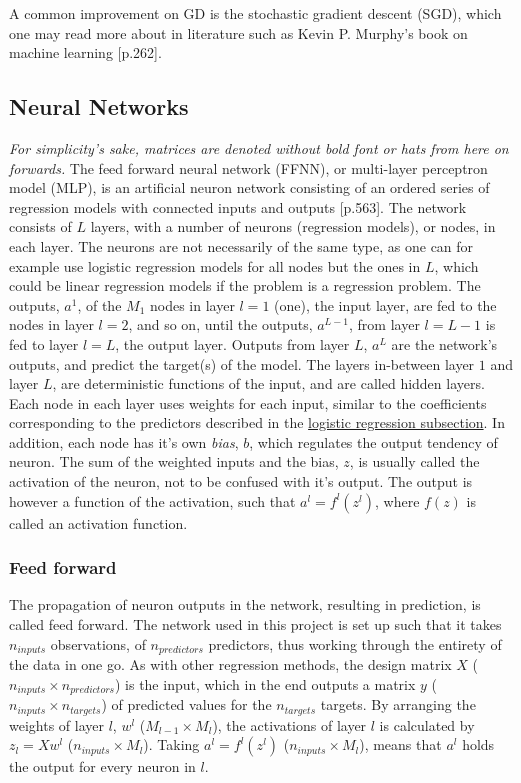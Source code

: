 \documentclass[%
oneside,                 %
final,                   %
10pt]{article}
\begin{document}
A common improvement on GD is the stochastic gradient descent (SGD), which one may read more about in literature such as Kevin P. Murphy's book on machine learning \citep{MLMurphy}[p.262].

\subsection{Neural Networks} \label{Section_M_NN}
\textit{For simplicity's sake, matrices are denoted without bold font or hats from here on forwards.} The feed forward neural network (FFNN), or multi-layer perceptron model (MLP), is an artificial neuron network consisting of an ordered series of regression models with connected inputs and outputs \citep{MLMurphy}[p.563]. The network consists of $L$ layers, with  a number of neurons (regression models), or nodes, in each layer. The neurons are not necessarily of the same type, as one can for example use logistic regression models for all nodes but the ones in $L$, which could be linear regression models if the problem is a regression problem. The outputs, $a^1$, of the $M_1$ nodes in layer $l=1$ (one), the input layer, are fed to the nodes in layer $l=2$, and so on, until the outputs, $a^{L-1}$, from layer $l=L-1$ is fed to layer $l=L$, the output layer. Outputs from layer $L$, $a^L$ are the network's outputs, and predict the target(s) of the model. The layers in-between layer $1$ and layer $L$, are deterministic functions of the input, and are called hidden layers.  Each node in each layer uses weights for each input, similar to the coefficients  corresponding to the predictors described in the \hyperref[Section_M_Logreg]{logistic regression subsection}. In addition, each node has it's own \textit{bias}, $b$, which regulates the output tendency of neuron. The sum of the weighted inputs and the bias, $z$, is usually called the activation of the neuron, not to be confused with it's output. The output is however a function of the activation, such that $a^l=f^l(z^l)$, where $f(z)$ is called an activation function. 


\subsubsection{Feed forward}
The propagation of neuron outputs in the network, resulting in prediction, is called feed forward. The network used in this project is set up such that it takes  $n_{inputs}$ observations, of $n_{predictors}$ predictors, thus working through the entirety of the data in one go. As with other regression methods, the design matrix $X$ ($n_{inputs} \times n_{predictors}$) is the input, which in the end outputs a matrix $ y$ ($n_{inputs} \times n_{targets}$) of predicted values for the $n_{targets}$ targets. By arranging the weights of layer $l$, $w^l$ ($M_{l-1} \times M_l$), the activations of layer $l$ is calculated by $z_l=X w^l$ ($n_{inputs} \times M_l$). Taking $a^l=f^l(z^l)$ ($n_{inputs} \times M_l$), means that $a^l$ holds the output for every neuron in $l$. 
\end{document}
